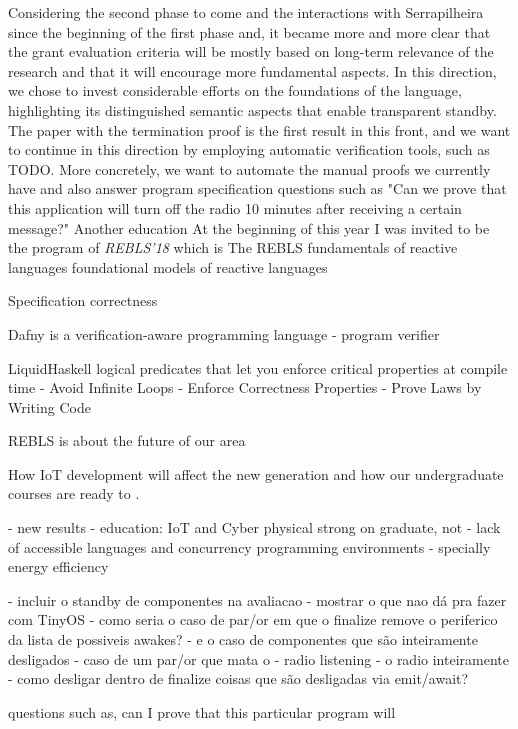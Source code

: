 \documentclass[12pt,english]{amsart}
\begin{document}
Considering the second phase to come and the interactions with Serrapilheira
since the beginning of the first phase and, it became more and more clear that
the grant evaluation criteria will be mostly based on long-term relevance of
the research and that it will encourage more fundamental aspects.
%
In this direction, we chose to invest considerable efforts on the foundations
of the language, highlighting its distinguished semantic aspects that enable
transparent standby.
The paper with the termination proof is the first result in this front, and we
want to continue in this direction by employing automatic verification tools,
such as TODO.
More concretely, we want to automate the manual proofs we currently have and
also answer program specification questions such as "Can we prove that this
application will turn off the radio 10 minutes after receiving a certain
message?"
%
Another education
%
At the beginning of this year I was invited to be the program of
\emph{REBLS'18} which is
The REBLS fundamentals of reactive languages
foundational models of reactive languages


Specification correctness

Dafny is a verification-aware programming language
    - program verifier

LiquidHaskell
 logical predicates that let you enforce critical properties at compile time
    - Avoid Infinite Loops
    - Enforce Correctness Properties
    - Prove Laws by Writing Code

REBLS is about the future of our area

How IoT development will affect the new generation and how our undergraduate
courses are ready to .


- new results
- education: IoT and Cyber physical strong on graduate, not 
    - lack of accessible languages and concurrency programming environments
    - specially energy efficiency

- incluir o standby de componentes na avaliacao
- mostrar o que nao dá pra fazer com TinyOS
    - como seria o caso de par/or em que o finalize remove o periferico da lista de possiveis awakes?
    - e o caso de componentes que são inteiramente desligados
        - caso de um par/or que mata o
            - radio listening
            - o radio inteiramente
        - como desligar dentro de finalize coisas que são desligadas via emit/await?


questions such as, can I prove that this particular program will
\end{document}
